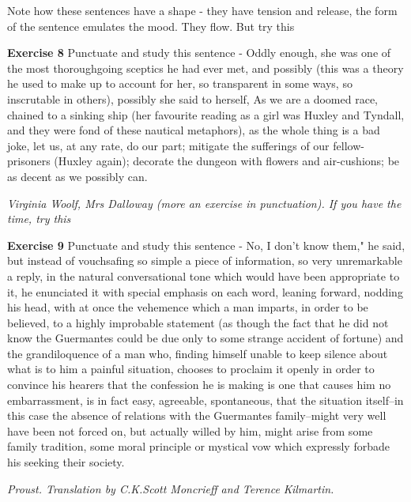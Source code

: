 \documentclass[11pt]{article}
\newenvironment{narrow}[2]{%
 \begin{list}{}{%
  \setlength{\topsep}{0pt}%
  \setlength{\leftmargin}{#1}%
  \setlength{\rightmargin}{#2}%
  \setlength{\listparindent}{\parindent}%
  \setlength{\itemindent}{\parindent}%
  \setlength{\parsep}{\parskip}%
 }%
\item[]}{\end{list}}
\begin{document}
Note how these sentences have a shape - they have tension and release, the form of the sentence emulates the mood. They flow. But try this




\begin{narrow}{1.0cm}{1.0cm}
\textbf{Exercise 8} Punctuate and study this sentence - 
Oddly enough, she was one of the most thoroughgoing sceptics he had ever met, 
and possibly (this was a theory he used to make up to account for her, so 
transparent in some ways, so inscrutable in others), possibly she said to 
herself, As we are a doomed race, chained to a sinking ship (her favourite 
reading as a girl was Huxley and Tyndall, and they were fond of these nautical 
metaphors), as the whole thing is a bad joke, let us, at any rate, do our part;
 mitigate the sufferings of our fellow-prisoners (Huxley again); decorate the 
dungeon with flowers and air-cushions; be as decent as we possibly can.
\end{narrow}
\textit{
Virginia Woolf, Mrs Dalloway (more an exercise in punctuation). If you have the time, try this
}



\begin{narrow}{1.0cm}{1.0cm}
\textbf{Exercise 9} Punctuate and study this sentence - No, I don't know them," he said, but instead of vouchsafing so simple a piece of information, so very unremarkable a reply, in the natural conversational tone which would have been appropriate to it, he enunciated it with special emphasis on each word, leaning forward, nodding his head, with at once the vehemence which a man imparts, in order to be believed, to a highly improbable statement (as though the fact that he did not know the Guermantes could be due only to some strange accident of fortune) and the grandiloquence of a man who, finding himself unable to keep silence about what is to him a painful situation, chooses to proclaim it openly in order to convince his hearers that the confession he is making is one that causes him no embarrassment, is in fact easy, agreeable, spontaneous, that the situation itself--in this case the absence of relations with the Guermantes family--might very well have been not forced on, but actually willed by him, might arise from some family tradition, some moral principle or mystical vow which expressly forbade his seeking their society.
\end{narrow}
\textit{
Proust. Translation by C.K.Scott Moncrieff and Terence Kilmartin.
}
\end{document}
